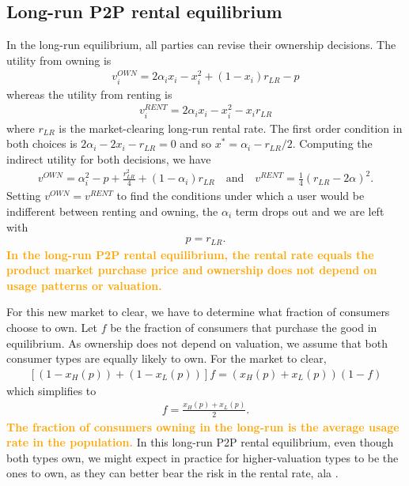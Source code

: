 \documentclass[11pt]{article}
\newcommand{\important}[1]{\textcolor{orange}{\textbf{#1}}}
\newcommand{\important}[1]{#1}
\begin{document}
\subsection{Long-run P2P rental equilibrium} 
In the long-run equilibrium, all parties can revise their ownership decisions. 
The utility from owning is 
\begin{align}
v^{OWN}_i = 2\alpha_i x_i - x_i^2 + (1-x_i)r_{LR} - p   
\end{align} 
whereas the utility from renting is 
\begin{align}
v^{RENT}_{i} = 2\alpha_i x_i - x_i^2 - x_i r_{LR}  
\end{align} 
where $r_{LR}$ is the market-clearing long-run rental rate. 
The first order condition in both choices is $2 \alpha_i - 2 x_i - r_{LR} = 0$ and so $x^* = \alpha_i - r_{LR}/2$. 
Computing the indirect utility for both decisions, we have
\begin{align} 
v^{OWN} = \alpha_i^2 - p + \frac{r_{LR}^2}{4} + (1 - \alpha_i) r_{LR} \quad  \mbox{and} \quad v^{RENT} = \frac{1}{4} (r_{LR}- 2\alpha )^2. 
\end{align} 
Setting $v^{OWN} = v^{RENT}$ to find the conditions under which a user would be indifferent between renting and owning, the $\alpha_i$ term drops out and we are left with 
\begin{align}
p = r_{LR}. 
\end{align}
 \important{In the long-run P2P rental equilibrium, the rental rate equals the product market purchase price and ownership does not depend on usage patterns or valuation.}  

For this new market to clear, we have to determine what fraction of consumers choose to own. 
Let $f$ be the fraction of consumers that purchase the good in equilibrium. 
As ownership does not depend on valuation, we assume that both consumer types are equally likely to own. 
For the market to clear, 
\begin{align}
\left[ (1-x_H(p)) + (1-x_L(p))\right]f = \left(x_H(p) + x_L(p) \right)(1- f) 
\end{align} 
which simplifies to 
\begin{align}
f = \frac{x_H(p) + x_L(p)}{2}.  
\end{align} 
\important{The fraction of consumers owning in the long-run is the average usage rate in the population.}  
In this long-run P2P rental equilibrium, even though both types own, we might expect in practice for higher-valuation types to be the ones to own, as they can better bear the risk in the rental rate, ala \cite{sinai2005}.
\end{document}
